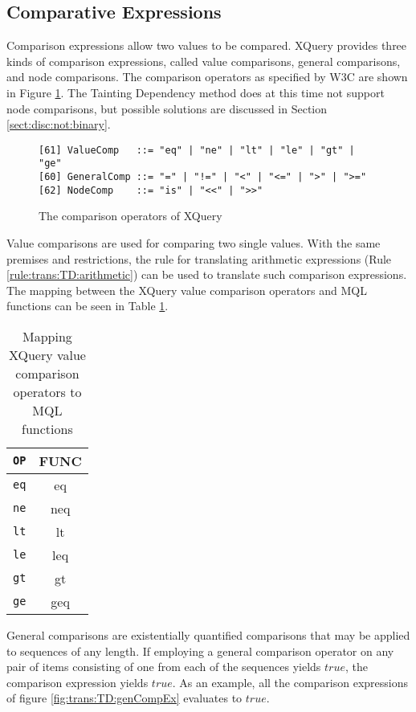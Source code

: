 \subsection{Comparative Expressions}
\label{sect:trans:TD:compArit}
Comparison expressions allow two values to be compared. XQuery provides three kinds of comparison expressions,
called value comparisons, general comparisons, and node comparisons. The comparison operators as specified by W3C
are shown in Figure \ref{fig:trans:TD:compEBNF}. The Tainting Dependency method does at this time not support node
comparisons, but possible solutions are discussed in Section \ref{sect:disc:not:binary}.

\begin{figure}[h]
\begin{Verbatim}
[61] ValueComp   ::= "eq" | "ne" | "lt" | "le" | "gt" | "ge"
[60] GeneralComp ::= "=" | "!=" | "<" | "<=" | ">" | ">="
[62] NodeComp    ::= "is" | "<<" | ">>"
\end{Verbatim}
\caption{The comparison operators of XQuery \cite{w3c00}}
\label{fig:trans:TD:compEBNF}
\end{figure}

Value comparisons are used for comparing two single values. With the same premises and restrictions, the rule for
translating arithmetic expressions (Rule \ref{rule:trans:TD:arithmetic}) can be used to translate such comparison
expressions. The mapping between the XQuery value comparison operators and MQL
functions can be seen in Table \ref{tab:trans:TD:valueComp}.

\begin{table}[h]
\centering
\begin{tabular}{c|c}
\texttt{OP} & \textsf{FUNC} \\ \hline
\texttt{eq} & \textsf{eq} \\
\texttt{ne} & \textsf{neq} \\
\texttt{lt} & \textsf{lt} \\
\texttt{le} & \textsf{leq} \\
\texttt{gt} & \textsf{gt} \\
\texttt{ge} & \textsf{geq} \\
\end{tabular}
\caption{Mapping XQuery value comparison operators to MQL functions \label{tab:trans:TD:valueComp}}
\end{table}

General comparisons are existentially quantified comparisons that may be applied to sequences of any length. If
employing a general comparison operator on any pair of items consisting of one from each of the sequences yields
$true$, the comparison expression yields $true$. As an example, all the comparison expressions of figure
\ref{fig:trans:TD:genCompEx} evaluates to $true$.

